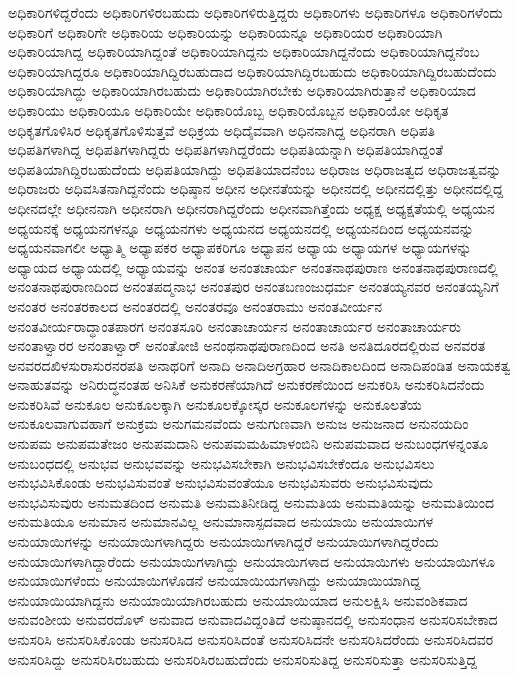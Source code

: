 {ಅಧಿಕಾರಿಗಳಿದ್ದರೆಂದು
ಅಧಿಕಾರಿಗಳಿರಬಹುದು
ಅಧಿಕಾರಿಗಳಿರುತ್ತಿದ್ದರು
ಅಧಿಕಾರಿಗಳು
ಅಧಿಕಾರಿಗಳೂ
ಅಧಿಕಾರಿಗಳೆಂದು
ಅಧಿಕಾರಿಗೆ
ಅಧಿಕಾರಿಗೇ
ಅಧಿಕಾರಿಯ
ಅಧಿಕಾರಿಯನ್ನು
ಅಧಿಕಾರಿಯನ್ನೂ
ಅಧಿಕಾರಿಯರ
ಅಧಿಕಾರಿಯಾಗಿ
ಅಧಿಕಾರಿಯಾಗಿದ್ದ
ಅಧಿಕಾರಿಯಾಗಿದ್ದಂತೆ
ಅಧಿಕಾರಿಯಾಗಿದ್ದನು
ಅಧಿಕಾರಿಯಾಗಿದ್ದನೆಂದು
ಅಧಿಕಾರಿಯಾಗಿದ್ದನೆಂಬ
ಅಧಿಕಾರಿಯಾಗಿದ್ದರೂ
ಅಧಿಕಾರಿಯಾಗಿದ್ದಿರಬಹುದಾದ
ಅಧಿಕಾರಿಯಾಗಿದ್ದಿರಬಹುದು
ಅಧಿಕಾರಿಯಾಗಿದ್ದಿರಬಹುದೆಂದು
ಅಧಿಕಾರಿಯಾಗಿದ್ದು
ಅಧಿಕಾರಿಯಾಗಿರಬಹುದು
ಅಧಿಕಾರಿಯಾಗಿರಬೇಕು
ಅಧಿಕಾರಿಯಾಗಿರುತ್ತಾನೆ
ಅಧಿಕಾರಿಯಾದ
ಅಧಿಕಾರಿಯು
ಅಧಿಕಾರಿಯೂ
ಅಧಿಕಾರಿಯೇ
ಅಧಿಕಾರಿಯೊಬ್ಬ
ಅಧಿಕಾರಿಯೊಬ್ಬನ
ಅಧಿಕಾರಿಯೋ
ಅಧಿಕೃತ
ಅಧಿಕೃತಗೊಳಿಸಿರ
ಅಧಿಕೃತಗೊಳಿಸುತ್ತವೆ
ಅಧಿಕ್ರಯ
ಅಧಿದೈವವಾಗಿ
ಅಧಿನನಾಗಿದ್ದ
ಅಧಿನರಾಗಿ
ಅಧಿಪತಿ
ಅಧಿಪತಿಗಳಾಗಿದ್ದ
ಅಧಿಪತಿಗಳಾಗಿದ್ದರು
ಅಧಿಪತಿಗಳಾಗಿದ್ದರೆಂದು
ಅಧಿಪತಿಯನ್ನಾಗಿ
ಅಧಿಪತಿಯಾಗಿದ್ದಂತೆ
ಅಧಿಪತಿಯಾಗಿದ್ದಿರಬಹುದೆಂದು
ಅಧಿಪತಿಯಾಗಿದ್ದು
ಅಧಿಪತಿಯಾದನೆಂಬ
ಅಧಿರಾಜ
ಅಧಿರಾಜತ್ವದ
ಅಧಿರಾಜತ್ವವನ್ನು
ಅಧಿರಾಜರು
ಅಧಿವಸಿತನಾಗಿದ್ದನೆಂದು
ಅಧಿಷ್ಠಾನ
ಅಧೀನ
ಅಧೀನತೆಯನ್ನು
ಅಧೀನದಲ್ಲಿ
ಅಧೀನದಲ್ಲಿತ್ತು
ಅಧೀನದಲ್ಲಿದ್ದ
ಅಧೀನದಲ್ಲೇ
ಅಧೀನನಾಗಿ
ಅಧೀನರಾಗಿ
ಅಧೀನರಾಗಿದ್ದರೆಂದು
ಅಧೀನವಾಗಿತ್ತೆಂದು
ಅಧ್ಯಕ್ಷ
ಅಧ್ಯಕ್ಷತೆಯಲ್ಲಿ
ಅಧ್ಯಯನ
ಅಧ್ಯಯನಕ್ಕೆ
ಅಧ್ಯಯನಗಳನ್ನೂ
ಅಧ್ಯಯನಗಳು
ಅಧ್ಯಯನದ
ಅಧ್ಯಯನದಲ್ಲಿ
ಅಧ್ಯಯನದಿಂದ
ಅಧ್ಯಯನವನ್ನು
ಅಧ್ಯಯನವಾಗಲೀ
ಅಧ್ಯಾತ್ಮಿ
ಅಧ್ಯಾಪಕರ
ಅಧ್ಯಾಪಕರಿಗೂ
ಅಧ್ಯಾಪನ
ಅಧ್ಯಾಯ
ಅಧ್ಯಾಯಗಳ
ಅಧ್ಯಾಯಗಳನ್ನು
ಅಧ್ಯಾಯದ
ಅಧ್ಯಾಯದಲ್ಲಿ
ಅಧ್ಯಾಯವನ್ನು
ಅನಂತ
ಅನಂತಚಾರ್ಯ
ಅನಂತನಾಥಪುರಾಣ
ಅನಂತನಾಥಪುರಾಣದಲ್ಲಿ
ಅನಂತನಾಥಪುರಾಣದಿಂದ
ಅನಂತಪದ್ಮನಾಭ
ಅನಂತಪುರ
ಅನಂತಬಣಂಜುಧರ್ಮ
ಅನಂತಯ್ಯನವರ
ಅನಂತಯ್ಯನಿಗೆ
ಅನಂತರ
ಅನಂತರಕಾಲದ
ಅನಂತರದಲ್ಲಿ
ಅನಂತರವೂ
ಅನಂತರಾಮು
ಅನಂತವೀರ್ಯನ
ಅನಂತವೀರ್ಯರಾದ್ಧಾಂತಪಾರಗ
ಅನಂತಸೂರಿ
ಅನಂತಾಚಾರ್ಯನ
ಅನಂತಾಚಾರ್ಯರ
ಅನಂತಾಚಾರ್ಯರು
ಅನಂತಾಳ್ವಾರರ
ಅನಂತಾಳ್ವಾರ್
ಅನಂತೋಜಿ
ಅನಂಥನಾಥಪುರಾಣದಿಂದ
ಅನತಿ
ಅನತಿದೂರದಲ್ಲಿರುವ
ಅನವರತ
ಅನವರದಖಿಳಸುರಾಸುರನರಪತಿ
ಅನಾಥರಿಗೆ
ಅನಾದಿ
ಅನಾದಿಅಗ್ರಹಾರ
ಅನಾದಿಕಾಲದಿಂದ
ಅನಾದಿಪಂಡಿತ
ಅನಾಯಕತ್ವ
ಅನಾಹುತವನ್ನು
ಅನಿರುದ್ಧನಂತಹ
ಅನಿಸಿಕೆ
ಅನುಕರಣೆಯಾಗಿದೆ
ಅನುಕರಣೆಯಿಂದ
ಅನುಕರಿಸಿ
ಅನುಕರಿಸಿದನೆಂದು
ಅನುಕರಿಸಿವೆ
ಅನುಕೂಲ
ಅನುಕೂಲಕ್ಕಾಗಿ
ಅನುಕೂಲಕ್ಕೋಸ್ಕರ
ಅನುಕೂಲಗಳನ್ನು
ಅನುಕೂಲತೆಯ
ಅನುಕೂಲವಾಗುವಹಾಗೆ
ಅನುಕ್ರಮ
ಅನುಗಮನವೆಂದು
ಅನುಗುಣವಾಗಿ
ಅನುಜ
ಅನುಜನಾದ
ಅನುನಯದಿಂ
ಅನುಪಮ
ಅನುಪಮತೇಜಂ
ಅನುಪಮದಾನಿ
ಅನುಪಮಮಹಿಮಾಳಂಬಿನಿ
ಅನುಪಮವಾದ
ಅನುಬಂಧಗಳನ್ನಂತೂ
ಅನುಬಂಧದಲ್ಲಿ
ಅನುಭವ
ಅನುಭವವನ್ನು
ಅನುಭವಿಸಬೇಕಾಗಿ
ಅನುಭವಿಸಬೇಕೆಂದೂ
ಅನುಭವಿಸಲು
ಅನುಭವಿಸಿಕೊಂಡು
ಅನುಭವಿಸುವಂತೆ
ಅನುಭವಿಸುವಂತೆಯೂ
ಅನುಭವಿಸುವರು
ಅನುಭವಿಸುವುದು
ಅನುಭವಿಸುವುರು
ಅನುಮತದಿಂದ
ಅನುಮತಿ
ಅನುಮತಿನೀಡಿದ್ದ
ಅನುಮತಿಯ
ಅನುಮತಿಯನ್ನು
ಅನುಮತಿಯಿಂದ
ಅನುಮತಿಯೂ
ಅನುಮಾನ
ಅನುಮಾನವಿಲ್ಲ
ಅನುಮಾನಾಸ್ಪದವಾದ
ಅನುಯಾಯಿ
ಅನುಯಾಯಿಗಳ
ಅನುಯಾಯಿಗಳನ್ನು
ಅನುಯಾಯಿಗಳಾಗಿದ್ದರು
ಅನುಯಾಯಿಗಳಾಗಿದ್ದರೆ
ಅನುಯಾಯಿಗಳಾಗಿದ್ದರೆಂದು
ಅನುಯಾಯಿಗಳಾಗಿದ್ದಾರೆಂದು
ಅನುಯಾಯಿಗಳಾಗಿದ್ದು
ಅನುಯಾಯಿಗಳಾದ
ಅನುಯಾಯಿಗಳು
ಅನುಯಾಯಿಗಳೂ
ಅನುಯಾಯಿಗಳೆಂದು
ಅನುಯಾಯಿಗಳೊಡನೆ
ಅನುಯಾಯಿಯಗಳಾಗಿದ್ದು
ಅನುಯಾಯಿಯಾಗಿದ್ದ
ಅನುಯಾಯಿಯಾಗಿದ್ದನು
ಅನುಯಾಯಿಯಾಗಿರಬಹುದು
ಅನುಯಾಯಿಯಾದ
ಅನುಲಕ್ಷಿಸಿ
ಅನುವಂಶಿಕವಾದ
ಅನುವಂಶೀಯ
ಅನುವರದೊಳ್
ಅನುವಾದ
ಅನುವಾದವಿದ್ದಂತಿದೆ
ಅನುಷ್ಠಾನದಲ್ಲಿ
ಅನುಸಂಧಾನ
ಅನುಸರಿಸಬೇಕಾದ
ಅನುಸರಿಸಿ
ಅನುಸರಿಸಿಕೊಂಡು
ಅನುಸರಿಸಿದ
ಅನುಸರಿಸಿದಂತೆ
ಅನುಸರಿಸಿದನೇ
ಅನುಸರಿಸಿದರೆಂದು
ಅನುಸರಿಸಿದವರ
ಅನುಸರಿಸಿದ್ದು
ಅನುಸರಿಸಿರಬಹುದು
ಅನುಸರಿಸಿರಬಹುದೆಂದು
ಅನುಸರಿಸುತಿದ್ದ
ಅನುಸರಿಸುತ್ತಾ
ಅನುಸರಿಸುತ್ತಿದ್ದ
}
